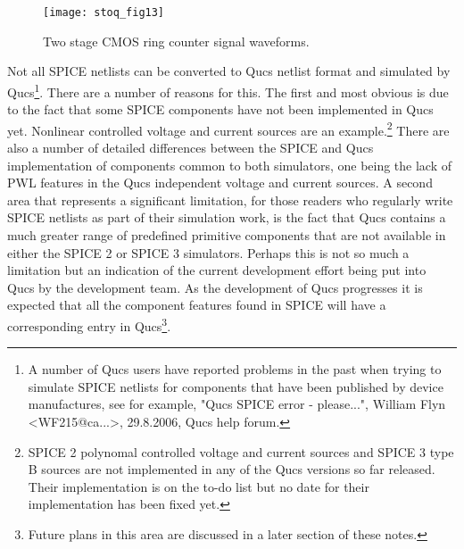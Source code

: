 \begin{figure}
  \centering
  \texttt{[image: stoq\_fig13]}
  \caption{Two stage CMOS ring counter signal waveforms.}
  \label{fig:stoq_fig13}
\end{figure} 

Not all SPICE netlists can be converted to Qucs netlist format and simulated by Qucs\footnote{A number of Qucs users have reported problems in the past when trying to simulate SPICE netlists for components that have been published by device manufactures, see for example, "Qucs SPICE error - please...", William Flyn <WF215@ca...>, 29.8.2006, Qucs help forum. }.  There are a number of reasons for this.  The first and most obvious is due to the fact that some SPICE components have not been implemented in Qucs yet.  Nonlinear controlled voltage and current sources are an example.\footnote{SPICE 2 polynomal controlled voltage and current sources and SPICE 3 type B sources are not implemented in any of the Qucs versions so far released. Their implementation is on the to-do list but no date for their implementation has been fixed yet. }  There are also a number of detailed differences between the SPICE and Qucs implementation of components common to both simulators, one being the lack of PWL features in the Qucs independent voltage and current sources. A second area that represents a significant limitation, for those readers who regularly write SPICE netlists as part of their simulation work, is the fact that Qucs contains a much greater range of predefined primitive components that are not available in either the SPICE 2 or SPICE 3 simulators.  Perhaps this is not so much a limitation but an indication of the current development effort being put into Qucs by the development team. As the development of Qucs progresses it is expected that all the component features found in SPICE will have a corresponding entry in Qucs\footnote{Future plans in this area are discussed in a later section of these notes.}. 

